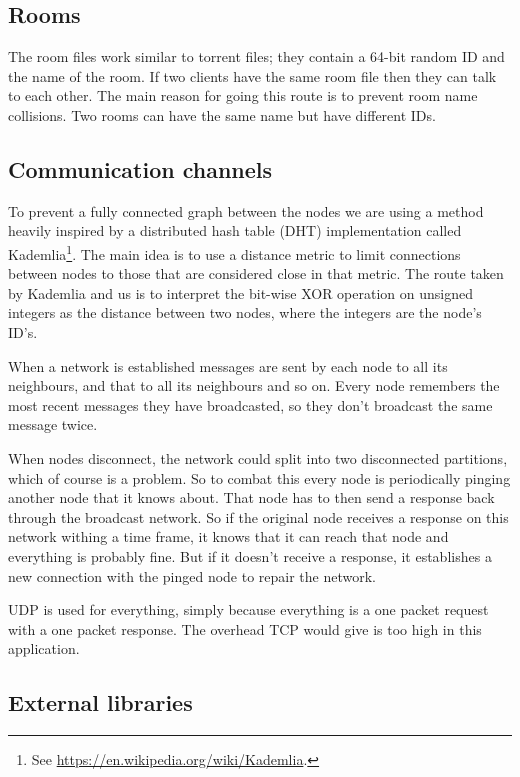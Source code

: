 \documentclass[12pt, a4paper]{article}
\begin{document}
\subsection{Rooms}

The room files work similar to torrent files; they contain a 64-bit random ID and the name of the room. If two clients have the same room file then they can talk to each other. The main reason for going this route is to prevent room name collisions. Two rooms can have the same name but have different IDs.

\subsection{Communication channels}

To prevent a fully connected graph between the nodes we are using a method heavily inspired by a distributed hash table (DHT) implementation called Kademlia\footnote{See \url{https://en.wikipedia.org/wiki/Kademlia}.}. The main idea is to use a distance metric to limit connections between nodes to those that are considered close in that metric. The route taken by Kademlia and us is to interpret the bit-wise XOR operation on unsigned integers as the distance between two nodes, where the integers are the node's ID's.

When a network is established messages are sent by each node to all its neighbours, and that to all its neighbours and so on. Every node remembers the most recent messages they have broadcasted, so they don't broadcast the same message twice.

When nodes disconnect, the network could split into two disconnected partitions, which of course is a problem. So to combat this every node is periodically pinging another node that it knows about. That node has to then send a response back through the broadcast network. So if the original node receives a response on this network withing a time frame, it knows that it can reach that node and everything is probably fine. But if it doesn't receive a response, it establishes a new connection with the pinged node to repair the network.

UDP is used for everything, simply because everything is a one packet request with a one packet response. The overhead TCP would give is too high in this application.

\subsection{External libraries}
\label{sec:libs}
\end{document}
